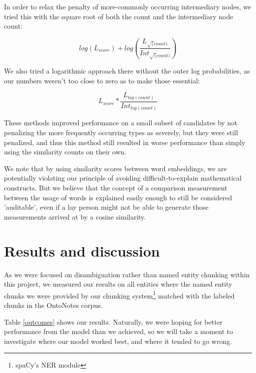 \documentclass[11pt,a4paper]{article}
\begin{document}
In order to relax the penalty of more-commonly occurring intermediary nodes, we tried this with the square root of both the count and the intermediary node count:

$$ log(L_{score}) + log(\frac{L_{\sqrt(count)}}{Int_{\sqrt(count)}}) $$

We also tried a logarithmic approach there without the outer log probabilities, as our numbers weren't too close to zero as to make those essential:

$$ L_{score} * \frac{L_{log(count)}}{Int_{log(count)}} $$

These methods improved performance on a small subset of candidates by not penalizing the more frequently occurring types as severely, but they were still penalized, and thus this method still resulted in worse performance than simply using the similarity counts on their own.

We note that by using similarity scores between word embeddings, we are potentially violating our principle of avoiding difficult-to-explain mathematical constructs. But we believe that the concept of a comparison measurement between the usage of words is explained easily enough to still be considered 'auditable', even if a lay person might not be able to generate those measurements arrived at by a cosine similarity.

\section{Results and discussion}

As we were focused on disambiguation rather than named entity chunking within this project, we measured our results on all entities where the named entity chunks we were provided by our chunking system\footnote{spaCy's NER module} matched with the labeled chunks in the OntoNotes corpus.

Table \ref{outcomes} shows our results. Naturally, we were hoping for better performance from the model than we achieved, so we will take a moment to investigate where our model worked best, and where it tended to go wrong.
\end{document}
